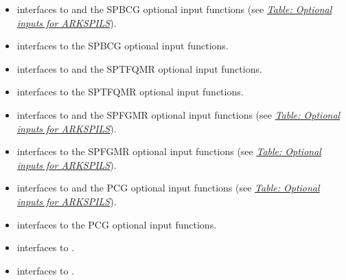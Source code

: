\documentclass[letterpaper,10pt,english]{sphinxmanual}
\begin{document}
\begin{itemize}
\item {} 
{\hyperref[f_interface/Usage:f/_/FARKSPBCG]{}} interfaces to {\hyperref[c_interface/User_callable:ARKSpbcg]{}} and the SPBCG optional input
functions (see {\hyperref[c_interface/User_callable:cinterface-arkspilsinputtable]{\emph{Table: Optional inputs for ARKSPILS}}}).

\item {} 
{\hyperref[f_interface/Usage:f/_/FARKSPBCGREINIT]{}} interfaces to the SPBCG optional input
functions.

\item {} 
{\hyperref[f_interface/Usage:f/_/FARKSPTFQMR]{}} interfaces to {\hyperref[c_interface/User_callable:ARKSptfqmr]{}} and the SPTFQMR optional
input functions.

\item {} 
{\hyperref[f_interface/Usage:f/_/FARKSPTFQMRREINIT]{}} interfaces to the SPTFQMR optional input
functions.

\item {} 
{\hyperref[f_interface/Usage:f/_/FARKSPFGMR]{}} interfaces to {\hyperref[c_interface/User_callable:ARKSpfgmr]{}} and the SPFGMR optional input
functions (see {\hyperref[c_interface/User_callable:cinterface-arkspilsinputtable]{\emph{Table: Optional inputs for ARKSPILS}}}).

\item {} 
{\hyperref[f_interface/Usage:f/_/FARKSPFGMRREINIT]{}} interfaces to the SPFGMR optional input
functions (see {\hyperref[c_interface/User_callable:cinterface-arkspilsinputtable]{\emph{Table: Optional inputs for ARKSPILS}}}).

\item {} 
{\hyperref[f_interface/Usage:f/_/FARKPCG]{}} interfaces to {\hyperref[c_interface/User_callable:ARKPcg]{}} and the PCG optional input
functions (see {\hyperref[c_interface/User_callable:cinterface-arkspilsinputtable]{\emph{Table: Optional inputs for ARKSPILS}}}).

\item {} 
{\hyperref[f_interface/Usage:f/_/FARKPCGREINIT]{}} interfaces to the PCG optional input
functions.

\item {} 
{\hyperref[f_interface/Usage:f/_/FARKSPILSSETJAC]{}} interfaces to {\hyperref[c_interface/User_callable:ARKSpilsSetJacTimesVecFn]{}}.

\item {} 
{\hyperref[f_interface/Usage:f/_/FARKSPILSSETPREC]{}} interfaces to {\hyperref[c_interface/User_callable:ARKSpilsSetPreconditioner]{}}.

\end{itemize}
\end{document}
